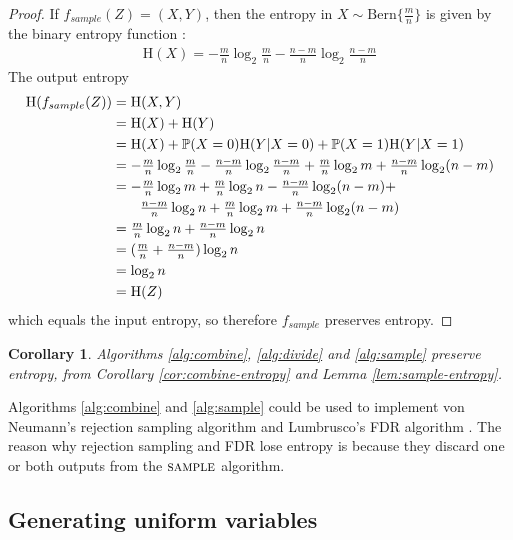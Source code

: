 \documentclass[lettersize,onecolumn]{IEEEtran}
\newtheorem{corollary}{Corollary}
\newcommand{\bern}[1]{\mathrm{Bern}\{#1\}}
\newcommand{\entropy}[1]{\mathrm{H}(#1)}
\newcommand{\prob}[1]{\mathbb{P}(#1)}
\begin{document}
\begin{proof}If $f_{sample}(Z) = (X,Y)$, then the entropy in $X \sim \bern{\frac{m}{n}}$ is given by the binary entropy function \cite{cover1999elements}:
    \begin{align}
    \entropy{X} = -\tfrac{m}{n}\log_2\tfrac{m}{n} - \tfrac{n-m}{n}\log_2\tfrac{n-m}{n}
    \end{align}
    The output entropy
    \begin{align}
    \entropy{f_{sample}(Z)}  &= \entropy{X,Y} \\
                    &= \entropy{X} + \entropy{Y} \\
                    &= \entropy{X} + \prob{X=0}\entropy{Y|X=0} + \prob{X=1}\entropy{Y|X=1} \\
                    &= -\tfrac{m}{n}\log_2\tfrac{m}{n} - \tfrac{n-m}{n}\log_2\tfrac{n-m}{n} + \tfrac{m}{n}\log_2{m} + \tfrac{n-m}{n}\log_2(n-m) \\
                    &= -\tfrac{m}{n}\log_2m + \tfrac{m}{n}\log_2n - \tfrac{n-m}{n}\log_2(n-m) + \notag \\
                    &\quad\quad   \tfrac{n-m}{n}\log_2{n} + \tfrac{m}{n}\log_2{m} + \tfrac{n-m}{n}\log_2(n-m) \\
                    &= \tfrac{m}{n}\log_2n + \tfrac{n-m}{n}\log_2n \\
                    &= (\tfrac{m}{n} + \tfrac{n-m}{n})\log_2n \\
                    &= \log_2n \\
                    &= \entropy{Z}
    \end{align}
    which equals the input entropy, so therefore $f_{sample}$ preserves entropy.
\end{proof}

\begin{corollary}
    Algorithms \ref{alg:combine}, \ref{alg:divide} and \ref{alg:sample} preserve entropy, from Corollary \ref{cor:combine-entropy} and Lemma \ref{lem:sample-entropy}.
\end{corollary}

Algorithms \ref{alg:combine} and \ref{alg:sample} could be used to implement von Neumann's rejection sampling algorithm \cite{neumann51} and Lumbrusco's FDR algorithm \cite{lumbroso2013optimal}. The reason why rejection sampling and FDR lose entropy is because they discard one or both outputs from the $\textsc{sample}$ algorithm.



\subsection{Generating uniform variables}
\end{document}
